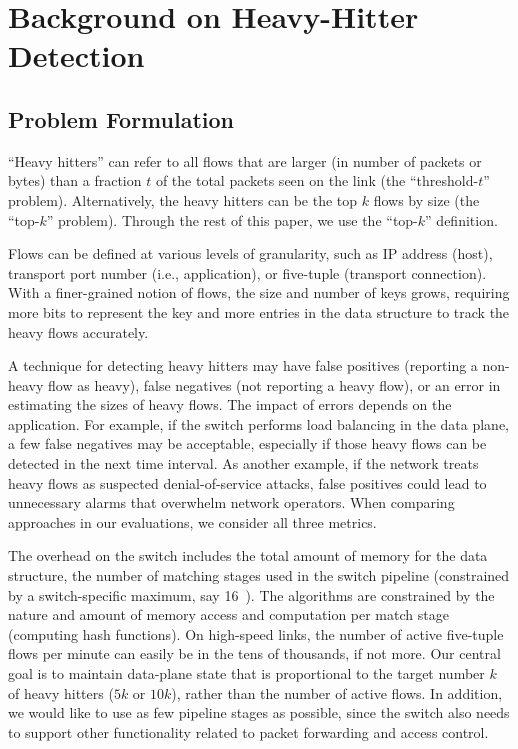 \section{Background on Heavy-Hitter Detection}
\subsection{Problem Formulation}
\label{sec:problem}

 ``Heavy hitters'' can refer to all flows that are
larger (in number of packets or bytes) than a fraction $t$ of the total packets
seen on the link (the ``threshold-$t$'' problem). Alternatively, the heavy
hitters can be the top $k$ flows by size (the ``top-$k$''
problem). Through the rest of this paper, we use the ``top-$k$'' definition. %

 Flows can be defined at various levels of
granularity, such as IP address (\ie host), transport port
number (i.e., application), or five-tuple (\ie transport connection). With a
finer-grained notion of flows, the size and number of keys grows, requiring more
bits to represent the key and more entries in the data structure to track 
the heavy flows accurately.

 A technique for detecting heavy hitters may have false
positives (\ie reporting a non-heavy flow as heavy), false negatives (\ie not
reporting a heavy flow), or an error in estimating the sizes of heavy flows.
The impact of errors depends on the application.  For example, if the switch
performs load balancing in the data plane, a few false negatives may be
acceptable, especially if those heavy flows can be detected in the next time
interval.  As another example, if the network treats heavy flows as suspected
denial-of-service attacks, false positives could lead to unnecessary alarms that
overwhelm network operators. When comparing approaches in our evaluations, we
consider all three metrics.

 The overhead on the switch includes the total amount of
memory for the data structure, the number of matching stages used in the switch
pipeline (constrained by a switch-specific maximum, say 16~\cite{RMT}). The
algorithms are constrained by the nature and amount of memory access and
computation per match stage (\eg computing hash functions). On high-speed links,
the number of active five-tuple flows per minute can easily be in the tens of
thousands, if not more. Our central goal is to maintain data-plane state that is proportional to the target number $k$ of heavy hitters (\eg $5k$ or
$10k$), rather than the number of active flows. In addition, we would like
to use as few pipeline stages as possible, since the switch also needs to
support other functionality related to packet forwarding and access control.

